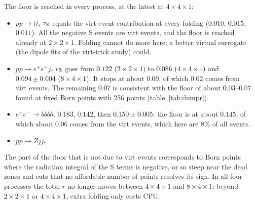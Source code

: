 The floor is reached in every process, at the latest at $4\times4\times1$:
\begin{itemize}
\item \textbf{$pp\to t\bar t$.} $r_{\mathrm S}$ equals the virt-event contribution at every folding
($0.010$, $0.015$, $0.011$). All the negative S events are virt events, and the floor is
reached already at $2\times2\times1$. Folding cannot do more here; a better virtual
surrogate (the dipole fits of the virt-trick study) could.
\item \textbf{$pp\to e^+e^-j$.} $r_{\mathrm S}$ goes from $0.122$ ($2\times2\times1$) to $0.086$
($4\times4\times1$) and $0.094\pm0.004$ ($8\times4\times1$). It stops at about $0.09$, of which
$0.02$ comes from virt events. The remaining $0.07$ is consistent with the floor of
about $0.03$--$0.07$ found at fixed Born points with 256 points (table~\ref{tab:dumpr}).
\item \textbf{$e^+e^-\to b\bar b b\bar b$.} $0.183$, $0.142$, then $0.150\pm0.005$: the floor is
at about $0.145$, of which about $0.06$ comes from the virt events, which here are 8\% of all
events.
\item \textbf{$pp\to Zjj$.} 
\end{itemize}
The part of the floor that is not due to virt events corresponds to Born points where the
radiation integral of the S terms is negative, or so steep near the dead zones and cuts
that no affordable number of points resolves its sign. In all four processes the total $r$
no longer moves between $4\times4\times1$ and $8\times4\times1$: beyond
$2\times2\times1$ or $4\times4\times1$, extra folding only costs CPU.
